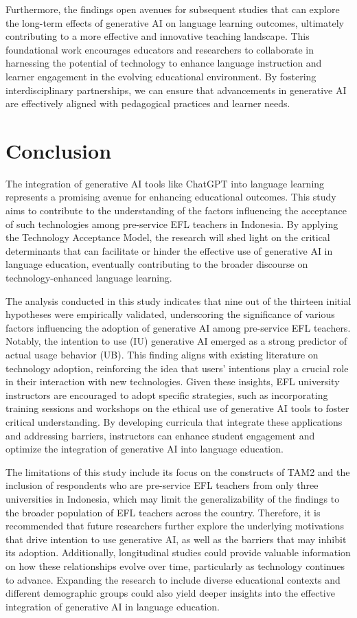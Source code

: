 \documentclass[english]{textolivre}
\begin{document}
Furthermore, the findings open avenues for subsequent studies that can explore the long-term effects of generative AI on language learning outcomes, ultimately contributing to a more effective and innovative teaching landscape. This foundational work encourages educators and researchers to collaborate in harnessing the potential of technology to enhance language instruction and learner engagement in the evolving educational environment. By fostering interdisciplinary partnerships, we can ensure that advancements in generative AI are effectively aligned with pedagogical practices and learner needs.


\section{Conclusion}\label{sec-listas}
The integration of generative AI tools like ChatGPT into language learning represents a promising avenue for enhancing educational outcomes. This study aims to contribute to the understanding of the factors influencing the acceptance of such technologies among pre-service EFL teachers in Indonesia. By applying the Technology Acceptance Model, the research will shed light on the critical determinants that can facilitate or hinder the effective use of generative AI in language education, eventually contributing to the broader discourse on technology-enhanced language learning.

The analysis conducted in this study indicates that nine out of the thirteen initial hypotheses were empirically validated, underscoring the significance of various factors influencing the adoption of generative AI among pre-service EFL teachers. Notably, the intention to use (IU) generative AI emerged as a strong predictor of actual usage behavior (UB). This finding aligns with existing literature on technology adoption, reinforcing the idea that users’ intentions play a crucial role in their interaction with new technologies. Given these insights, EFL university instructors are encouraged to adopt specific strategies, such as incorporating training sessions and workshops on the ethical use of generative AI tools to foster critical understanding. By developing curricula that integrate these applications and addressing barriers, instructors can enhance student engagement and optimize the integration of generative AI into language education.

The limitations of this study include its focus on the constructs of TAM2 and the inclusion of respondents who are pre-service EFL teachers from only three universities in Indonesia, which may limit the generalizability of the findings to the broader population of EFL teachers across the country. Therefore, it is recommended that future researchers further explore the underlying motivations that drive intention to use generative AI, as well as the barriers that may inhibit its adoption. Additionally, longitudinal studies could provide valuable information on how these relationships evolve over time, particularly as technology continues to advance. Expanding the research to include diverse educational contexts and different demographic groups could also yield deeper insights into the effective integration of generative AI in language education.
\end{document}

